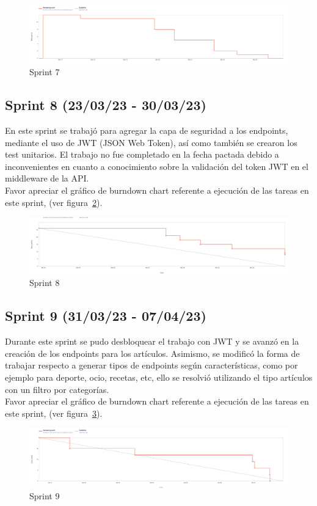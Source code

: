 \begin{figure}[h]
    \centering
    \includegraphics[width=1.0\textwidth]{img/sprint/sprint7.png}
    \caption{Sprint 7} \label{Img:Sprint+7}
\end{figure} 

\subsection{Sprint 8 (23/03/23 - 30/03/23)}\label{sprint-0-230323---300323}
En este sprint se trabajó para agregar la capa de seguridad a los endpoints, mediante el uso de JWT (JSON Web Token), así como también se crearon los test unitarios. El trabajo no fue completado en la fecha pactada debido a inconvenientes en cuanto a conocimiento sobre la validación del token JWT en el middleware de la API.\\
Favor apreciar el gráfico de burndown chart referente a ejecución de las tareas en este sprint, (ver figura~\ref{Img:Sprint+8}).

\begin{figure}[h]
    \centering
    \includegraphics[width=1.0\textwidth]{img/sprint/sprint8.png}
    \caption{Sprint 8} \label{Img:Sprint+8}
\end{figure} 

\subsection{Sprint 9 (31/03/23 - 07/04/23)}\label{sprint-0-310323---070423}
Durante este sprint se pudo desbloquear el trabajo con JWT y se avanzó en la creación de los endpoints para los artículos. Asimismo, se modificó la forma de trabajar respecto a generar tipos de endpoints según características, como por ejemplo para deporte, ocio, recetas, etc, ello se resolvió utilizando el tipo artículos con un filtro por categorías.\\
Favor apreciar el gráfico de burndown chart referente a ejecución de las tareas en este sprint, (ver figura~\ref{Img:Sprint+9}).
\begin{figure}[h]
    \centering
    \includegraphics[width=1.0\textwidth]{img/sprint/sprint9.png}
    \caption{Sprint 9} \label{Img:Sprint+9}
\end{figure}


